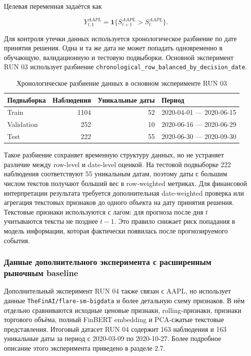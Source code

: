 Целевая переменная задаётся как

\[
Y_{t,1}^{AAPL}=\mathbf{1}\{S_{t+1}^{AAPL}>S_t^{AAPL}\}.
\]

Для контроля утечки данных используется хронологическое разбиение по дате принятия решения. Одна и та же дата не может попадать одновременно в обучающую, валидационную и тестовую подвыборки. Основной эксперимент RUN 03 использует разбиение \texttt{chronological\_row\_balanced\_by\_decision\_date}.

\begin{table}[htbp]
\centering
\begin{tabular}{lrrl}
\toprule
Подвыборка & Наблюдения & Уникальные даты & Период \\
\midrule
Train & 1104 & 52 & 2020-04-01 --- 2020-06-15 \\
Validation & 252 & 10 & 2020-06-16 --- 2020-06-29 \\
Test & 222 & 55 & 2020-06-30 --- 2020-09-30 \\
\bottomrule
\end{tabular}
\caption{Хронологическое разбиение данных в основном эксперименте RUN 03}
\label{tab:run03_split}
\end{table}

Такое разбиение сохраняет временную структуру данных, но не устраняет различие между row-level и date-level оценкой. На тестовой подвыборке 222 наблюдения соответствуют 55 уникальным датам, поэтому даты с большим числом текстов получают больший вес в row-weighted метриках. Для финансовой интерпретации результата требуется дополнительная date-weighted проверка или агрегация текстовых признаков до одного объекта на дату принятия решения. Текстовые признаки используются с лагом: для прогноза после дня $t$ учитываются тексты не позднее $t-1$. Это правило снижает риск попадания в модель информации, которая фактически появилась после прогнозируемого события.

\subsubsection{Данные дополнительного эксперимента с расширенным рыночным baseline}

Дополнительный эксперимент RUN 04 также связан с AAPL, но использует данные \texttt{TheFinAI/flare-sm-bigdata} и более детальную схему признаков. В нём отдельно сравниваются исходные ценовые признаки, rolling-признаки, признаки торгового объёма, полный FinBERT embedding и PCA-сжатые текстовые представления. Итоговый датасет RUN 04 содержит 163 наблюдения и 163 уникальные даты за период с 2020-03-09 по 2020-10-27. Более подробное описание этого эксперимента приведено в разделе 2.7.

